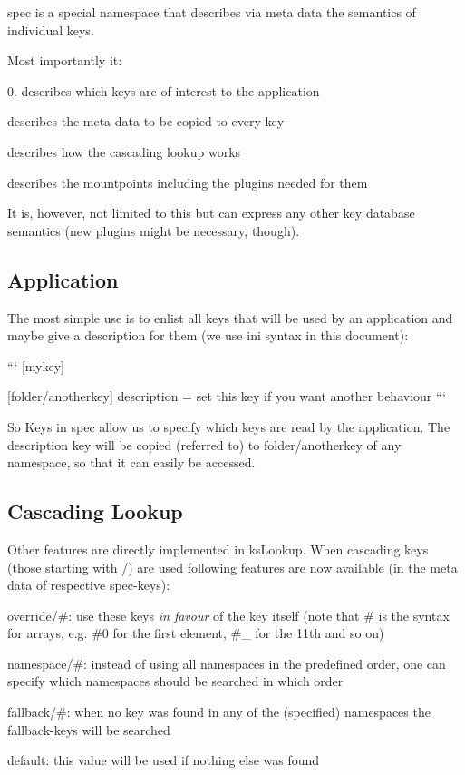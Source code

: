 spec is a special namespace that describes via meta data the semantics of individual keys.

Most importantly it\+:

0. describes which keys are of interest to the application
\begin{DoxyEnumerate}
\item describes the meta data to be copied to every key
\item describes how the cascading lookup works
\item describes the mountpoints including the plugins needed for them
\end{DoxyEnumerate}

It is, however, not limited to this but can express any other key database semantics (new plugins might be necessary, though).

\subsection*{Application}

The most simple use is to enlist all keys that will be used by an application and maybe give a description for them (we use ini syntax in this document)\+:

``` \mbox{[}mykey\mbox{]}

\mbox{[}folder/anotherkey\mbox{]} description = set this key if you want another behaviour ```

So Keys in {\ttfamily spec} allow us to specify which keys are read by the application. The description key will be copied (referred to) to {\ttfamily folder/anotherkey} of any namespace, so that it can easily be accessed.

\subsection*{Cascading Lookup}

Other features are directly implemented in {\ttfamily ks\+Lookup}. When cascading keys (those starting with {\ttfamily /}) are used following features are now available (in the meta data of respective {\ttfamily spec}-\/keys)\+:


\begin{DoxyItemize}
\item {\ttfamily override/\#}\+: use these keys {\itshape in favour} of the key itself (note that {\ttfamily \#} is the syntax for arrays, e.\+g. {\ttfamily \#0} for the first element, {\ttfamily \#\+\_} for the 11th and so on)
\item {\ttfamily namespace/\#}\+: instead of using all namespaces in the predefined order, one can specify which namespaces should be searched in which order
\item {\ttfamily fallback/\#}\+: when no key was found in any of the (specified) namespaces the {\ttfamily fallback}-\/keys will be searched
\item {\ttfamily default}\+: this value will be used if nothing else was found
\end{DoxyItemize}

